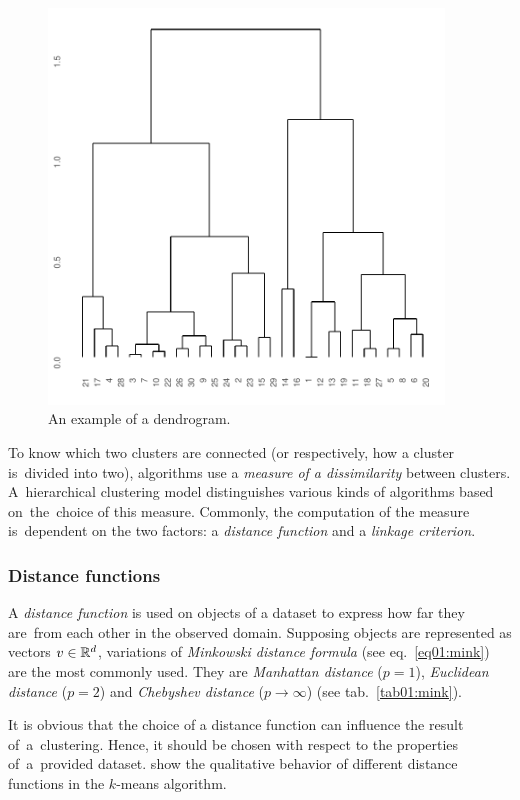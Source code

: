 \begin{figure}\centering
	\includegraphics[width=10.5cm]{img/dendro}
	\caption{An example of a dendrogram.}
	\label{fig01:dendro}
\end{figure}

To know which two clusters are connected (or respectively, how a cluster is~divided into two), algorithms use a \emph{measure of a dissimilarity} between clusters.  
A~hierarchical clustering model distinguishes various kinds of algorithms based on~the~choice of this measure. Commonly, the computation of the measure is~dependent on the two factors: a \emph{distance function} and a \emph{linkage criterion}. 

\subsubsection{Distance functions}

A \emph{distance function} is used on objects of a dataset to express how far they are~from each other in the observed domain. Supposing objects are represented as vectors $v \in \mathbb{R}^d$, variations of \emph{Minkowski distance formula} (see eq.~\ref{eq01:mink}) are the most commonly used.
They are \emph{Manhattan distance} ($p=1$), \emph{Euclidean distance} ($p=2$) and \emph{Chebyshev distance} ($p \to \infty$) (see tab.~\ref{tab01:mink}).

It is obvious that the choice of a distance function can influence the result of~a~clustering. Hence, it should be chosen with respect to the properties of~a~provided dataset. \citet{aggarwal2001surprising} show the qualitative behavior of different distance functions in the $k$-means algorithm.  

